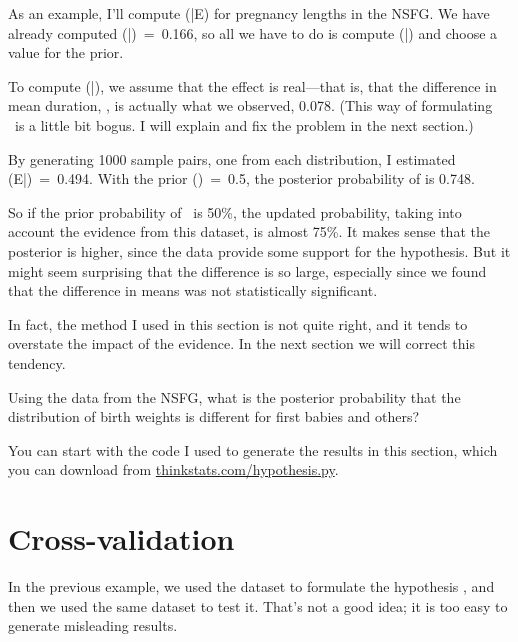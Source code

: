 \documentclass[12pt]{book}
\begin{document}
As an example, I'll compute \Prob(\HH{}|E) for pregnancy
lengths in the NSFG.  We have already computed
\Prob(\E|\HH{})~=~0.166, so all we have to do is compute
\Prob(\E|\HH{}) and choose a value for the prior.

To compute \Prob(\E|\HH{}), we assume that the effect is
real---that is,
that the difference in mean duration, \mydelta, is actually what we
observed, 0.078.  (This way of formulating \HH{}~is a little bit
bogus.  I will explain and fix the problem in the next section.)

By generating 1000 sample pairs, one from each
distribution, I estimated \Prob(E|\HH{})~=~0.494.  With the prior
\Prob(\HH{})~=~0.5, the posterior probability of \HH{} is 0.748.

So if the prior probability of \HH{}~is 50\%, the updated
probability, taking into account the evidence from this dataset,
is almost 75\%.  It makes sense that the posterior
is higher, since the data provide some support for the hypothesis.
But it might seem surprising that the difference is so large,
especially since we found that the difference in means was not
statistically significant.

In fact, the method I used in this section is not quite right, and
it tends to overstate the impact of the evidence.  In the next section
we will correct this tendency.

\begin{exercise}
Using the data from the NSFG, what is the posterior probability that
the distribution of birth weights is different for first babies and
others?

You can start with the code I used to generate the results in this
section, which you can download from \url{thinkstats.com/hypothesis.py}.

\end{exercise}


\section{Cross-validation}

In the previous example, we used the dataset to formulate the
hypothesis \HH{}, and then we used the same dataset to test it.
That's not a good idea; it is too easy to generate misleading results.
\end{document}
